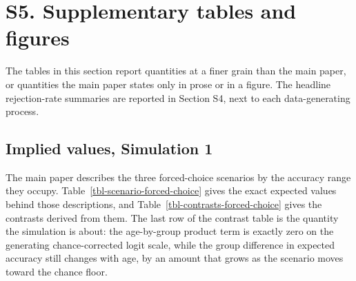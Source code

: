\documentclass[
  man,
  floatsintext,
  longtable,
  nolmodern,
  notxfonts,
  notimes,
  colorlinks=true,linkcolor=blue,citecolor=blue,urlcolor=blue]{apa7}
\begin{document}
\section{S5. Supplementary tables and
figures}\label{s5.-supplementary-tables-and-figures}

The tables in this section report quantities at a finer grain than the
main paper, or quantities the main paper states only in prose or in a
figure. The headline rejection-rate summaries are reported in Section
S4, next to each data-generating process.

\subsection{Implied values, Simulation
1}\label{implied-values-simulation-1}

The main paper describes the three forced-choice scenarios by the
accuracy range they occupy. Table~\ref{tbl-scenario-forced-choice} gives
the exact expected values behind those descriptions, and
Table~\ref{tbl-contrasts-forced-choice} gives the contrasts derived from
them. The last row of the contrast table is the quantity the simulation
is about: the age-by-group product term is exactly zero on the
generating chance-corrected logit scale, while the group difference in
expected accuracy still changes with age, by an amount that grows as the
scenario moves toward the chance floor.
\end{document}
